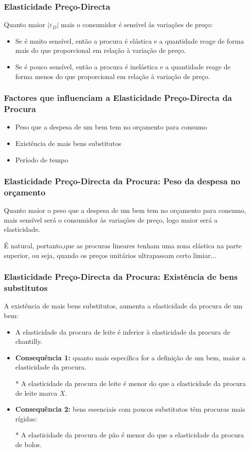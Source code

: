 \begin{frame}
	\frametitle{Elasticidade Pre\c co-Directa}
	Quanto maior $|\varepsilon_D|$ mais o consumidor \'e sens\'ivel \`as varia\c c\~oes de pre\c co:
	\begin{itemize}
		\item Se \'e muito sens\'ivel, ent\~ao a procura \'e el\'astica e a quantidade reage de forma mais do que proporcional em rela\c c\~ao \`a varia\c c\~ao de pre\c co.
		\item Se \'e pouco sens\'ivel, ent\~ao a procura \'e inel\'astica e a quantidade reage de forma menos do que proporcional em rela\c c\~ao \`a varia\c c\~ao de pre\c co.
	\end{itemize}
\end{frame}

\begin{frame}
	\frametitle{Factores que influenciam a Elasticidade Pre\c co-Directa da Procura}
	\begin{itemize}
		\setlength{\itemsep}{0.3cm}
		\item Peso que a despesa de um bem tem no or\c camento para consumo
		\item Exist\^encia de mais bens substitutos
		\item Per\'iodo de tempo
	\end{itemize}
\end{frame}

\begin{frame}
	\frametitle{Elasticidade Pre\c co-Directa da Procura: Peso da despesa no or\c camento}
	Quanto maior o peso que a despesa de um bem tem no or\c camento para consumo, mais sens\'ivel ser\'a o consumidor \`as varia\c c\~oes de pre\c co, logo maior ser\'a a elasticidade.\pause
	\par
	\vspace{0.5cm}
	\'E natural, portanto,que as procuras lineares tenham uma zona el\'astica na parte superior, ou seja, quando os pre\c cos unit\'arios ultrapassam certo limiar...
\end{frame}
\begin{frame}
	\frametitle{Elasticidade Pre\c co-Directa da Procura: Exist\^encia de bens substitutos}
	A exist\^encia de mais bens substitutos, aumenta a elasticidade da procura de um bem:
	\begin{itemize}
		\item A elasticidade da procura de leite \'e inferior \`a elasticidade da procura de chantilly.
		\item \textbf{Consequ\^encia 1:} quanto mais espec\'ifica for a defini\c c\~ao de um bem, maior a elasticidade da procura.
		\item[*] A elasticidade da procura de leite \'e menor do que a elasticidade da procura de leite marca $X$.
		\item \textbf{Consequ\^encia 2:} bens essenciais com poucos substitutos t\^em procuras mais r\'igidas:
		\item[*] A elasticidade da procura de p\~ao \'e menor do que a elasticidade da procura de bolos.
	\end{itemize}
	
\end{frame}

